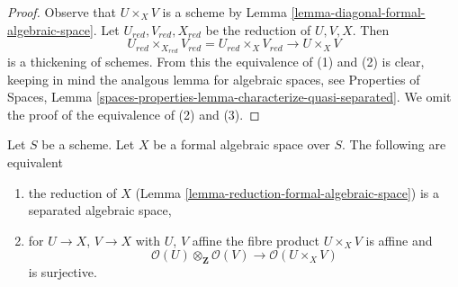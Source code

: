 \begin{proof}
Observe that $U \times_X V$ is a scheme by
Lemma \ref{lemma-diagonal-formal-algebraic-space}.
Let $U_{red}, V_{red}, X_{red}$ be the reduction of $U, V, X$.
Then
$$
U_{red} \times_{X_{red}} V_{red} = U_{red} \times_X V_{red} \to U \times_X V
$$
is a thickening of schemes. From this the equivalence of (1) and (2)
is clear, keeping in mind the analgous lemma for algebraic spaces, see
Properties of Spaces, Lemma
\ref{spaces-properties-lemma-characterize-quasi-separated}.
We omit the proof of the equivalence of (2) and (3).
\end{proof}

\begin{lemma}
\label{lemma-characterize-separated}
Let $S$ be a scheme. Let $X$ be a formal algebraic space over $S$.
The following are equivalent
\begin{enumerate}
\item the reduction of $X$
(Lemma \ref{lemma-reduction-formal-algebraic-space}) is a separated
algebraic space,
\item for $U \to X$, $V \to X$ with $U$, $V$ affine
the fibre product $U \times_X V$ is affine and
$$
\mathcal{O}(U) \otimes_\mathbf{Z} \mathcal{O}(V)
\longrightarrow
\mathcal{O}(U \times_X V)
$$
is surjective.
\end{enumerate}
\end{lemma}

